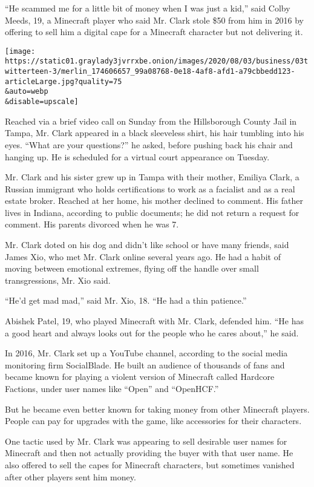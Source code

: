 ``He scammed me for a little bit of money when I was just a kid,'' said
Colby Meeds, 19, a Minecraft player who said Mr. Clark stole \$50 from
him in 2016 by offering to sell him a digital cape for a Minecraft
character but not delivering it.

\texttt{[image: https://static01.graylady3jvrrxbe.onion/images/2020/08/03/business/03twitterteen-3/merlin\_174606657\_99a08768-0e18-4af8-afd1-a79cbbedd123-articleLarge.jpg?quality=75\\\&auto=webp\\\&disable=upscale]}

Reached via a brief video call on Sunday from the Hillsborough County
Jail in Tampa, Mr. Clark appeared in a black sleeveless shirt, his hair
tumbling into his eyes. ``What are your questions?'' he asked, before
pushing back his chair and hanging up. He is scheduled for a virtual
court appearance on Tuesday.

Mr. Clark and his sister grew up in Tampa with their mother, Emiliya
Clark, a Russian immigrant who holds certifications to work as a
facialist and as a real estate broker. Reached at her home, his mother
declined to comment. His father lives in Indiana, according to public
documents; he did not return a request for comment. His parents divorced
when he was 7.

Mr. Clark doted on his dog and didn't like school or have many friends,
said James Xio, who met Mr. Clark online several years ago. He had a
habit of moving between emotional extremes, flying off the handle over
small transgressions, Mr. Xio said.

``He'd get mad mad,'' said Mr. Xio, 18. ``He had a thin patience.''

Abishek Patel, 19, who played Minecraft with Mr. Clark, defended him.
``He has a good heart and always looks out for the people who he cares
about,'' he said.

In 2016, Mr. Clark set up a YouTube channel, according to the social
media monitoring firm SocialBlade. He built an audience of thousands of
fans and became known for playing a violent version of Minecraft called
Hardcore Factions, under user names like ``Open'' and ``OpenHCF.''

But he became even better known for taking money from other Minecraft
players. People can pay for upgrades with the game, like accessories for
their characters.

One tactic used by Mr. Clark was appearing to sell desirable user names
for Minecraft and then not actually providing the buyer with that user
name. He also offered to sell the capes for Minecraft characters, but
sometimes vanished after other players sent him money.

